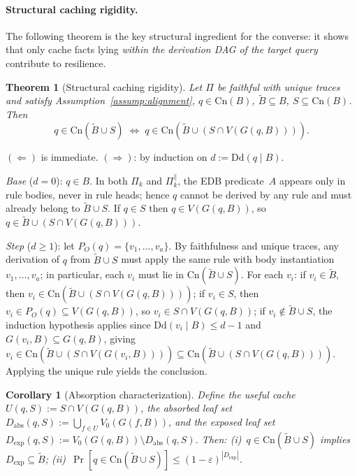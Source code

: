\documentclass[journal]{IEEEtran}
\makeatletter
\newcommand{\Dd}{\text{Dd}}
\newcommand{\Cn}{\text{Cn}}
\newtheorem{theorem}{Theorem}[section]
\newtheorem{corollary}{Corollary}[section]
\numberwithin{equation}{section}
\renewenvironment{proof}[1][\proofname]{\par
  \pushQED{\qed}%
  \normalfont \topsep6\p@\@plus6\p@\relax
  \trivlist
  \item[\hskip\labelsep
        \itshape
    #1\@addpunct{.}]\ignorespaces
}{%
  \popQED\endtrivlist\@endpefalse
}
\makeatother
\begin{document}
\paragraph{Structural caching rigidity.}

The following theorem is the key structural ingredient for the
converse: it shows that only cache facts lying \emph{within the
derivation DAG of the target query} contribute to resilience.

\begin{theorem}[Structural caching rigidity]
\label{thm:ancestral-relevance}
Let $\Pi$ be faithful with unique traces and satisfy
Assumption~\ref{assump:alignment}, $q\in\Cn(B)$,
$\tilde B\subseteq B$, $S\subseteq\Cn(B)$.
Then
\begin{equation}\label{eq:ancestral-relevance}
  q\in\Cn(\tilde B\cup S)
  \;\Longleftrightarrow\;
  q\in\Cn(\tilde B\cup(S\cap V(G(q,B)))).
\end{equation}
\end{theorem}

\begin{proof}
$(\Leftarrow)$ is immediate.
$(\Rightarrow)$: by induction on $d:=\Dd(q\mid B)$.

\emph{Base} ($d=0$): $q\in B$.
In both $\Pi_k$ and $\Pi_k^{\parallel}$, the EDB predicate~$A$
appears only in rule bodies, never in rule heads; hence $q$
cannot be derived by any rule and must already belong to
$\tilde B\cup S$.
If $q\in S$ then $q\in V(G(q,B))$, so
$q\in\tilde B\cup(S\cap V(G(q,B)))$.

\emph{Step} ($d\ge 1$): let $P_O(q)=\{v_1,\ldots,v_a\}$.
By faithfulness and unique traces, any derivation of $q$ from
$\tilde B\cup S$ must apply the same rule with body
instantiation $v_1,\ldots,v_a$; in particular, each $v_i$ must
lie in $\Cn(\tilde B\cup S)$.
For each $v_i$: if $v_i\in\tilde B$, then
$v_i\in\Cn(\tilde B\cup(S\cap V(G(q,B))))$;
if $v_i\in S$, then
$v_i\in P_O(q)\subseteq V(G(q,B))$, so
$v_i\in S\cap V(G(q,B))$;
if $v_i\notin\tilde B\cup S$, the induction hypothesis
applies since $\Dd(v_i\mid B)\le d{-}1$ and
$G(v_i,B)\subseteq G(q,B)$, giving
$v_i\in\Cn(\tilde B\cup(S\cap V(G(v_i,B))))
\subseteq\Cn(\tilde B\cup(S\cap V(G(q,B))))$.
Applying the unique rule yields the conclusion.
\end{proof}

\begin{corollary}[Absorption characterization]
\label{cor:absorption-char}
Define the useful cache $U(q,S):=S\cap V(G(q,B))$,
the absorbed leaf set
$D_{\mathrm{abs}}(q,S)
 :=\bigcup_{f\in U}V_0(G(f,B))$,
and the exposed leaf set
$D_{\mathrm{exp}}(q,S)
 :=V_0(G(q,B))\setminus D_{\mathrm{abs}}(q,S)$.
Then:
\textup{(i)}~$q\in\Cn(\tilde B\cup S)$ implies
$D_{\mathrm{exp}}\subseteq\tilde B$;
\textup{(ii)}~$\Pr[q\in\Cn(\tilde B\cup S)]
\le(1{-}\varepsilon)^{|D_{\mathrm{exp}}|}$.
\end{corollary}
\end{document}
